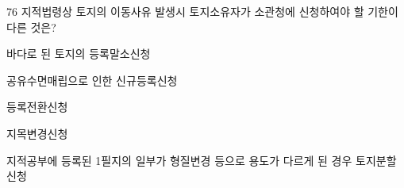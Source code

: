 \begin{question}{76}
지적법령상 토지의 이동사유 발생시 토지소유자가 소관청에 신청하여야 할 기한이 다른 것은?
\begin{choices}
  \item 바다로 된 토지의 등록말소신청
  \item 공유수면매립으로 인한 신규등록신청
  \item 등록전환신청
  \item 지목변경신청
  \item 지적공부에 등록된 1필지의 일부가 형질변경 등으로 용도가 다르게 된 경우 토지분할신청
\end{choices}
\end{question}
